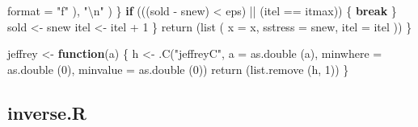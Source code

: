 \documentclass[
  12pt,
]{book}
\newenvironment{Shaded}{\begin{snugshade}}{\end{snugshade}}
\newcommand{\AttributeTok}[1]{\textcolor[rgb]{0.77,0.63,0.00}{#1}}
\newcommand{\ControlFlowTok}[1]{\textcolor[rgb]{0.13,0.29,0.53}{\textbf{#1}}}
\newcommand{\DecValTok}[1]{\textcolor[rgb]{0.00,0.00,0.81}{#1}}
\newcommand{\FunctionTok}[1]{\textcolor[rgb]{0.00,0.00,0.00}{#1}}
\newcommand{\NormalTok}[1]{#1}
\newcommand{\OtherTok}[1]{\textcolor[rgb]{0.56,0.35,0.01}{#1}}
\newcommand{\SpecialCharTok}[1]{\textcolor[rgb]{0.00,0.00,0.00}{#1}}
\newcommand{\StringTok}[1]{\textcolor[rgb]{0.31,0.60,0.02}{#1}}
\theoremstyle{definition}
\theoremstyle{definition}
\theoremstyle{definition}
\theoremstyle{definition}
\theoremstyle{remark}
\begin{document}
\begin{Shaded}
\begin{Highlighting}[]
            \AttributeTok{format =} \StringTok{"f"}
\NormalTok{          ),}
          \StringTok{"}\SpecialCharTok{\textbackslash{}n}\StringTok{"}
\NormalTok{        )}
\NormalTok{      \}}
      \ControlFlowTok{if}\NormalTok{ (((sold }\SpecialCharTok{{-}}\NormalTok{ snew) }\SpecialCharTok{\textless{}}\NormalTok{ eps) }\SpecialCharTok{||}\NormalTok{ (itel }\SpecialCharTok{==}\NormalTok{ itmax)) \{}
        \ControlFlowTok{break}
\NormalTok{      \}}
\NormalTok{      sold }\OtherTok{\textless{}{-}}\NormalTok{ snew}
\NormalTok{      itel }\OtherTok{\textless{}{-}}\NormalTok{ itel }\SpecialCharTok{+} \DecValTok{1}
\NormalTok{    \}}
    \FunctionTok{return}\NormalTok{ (}\FunctionTok{list}\NormalTok{ (}
      \AttributeTok{x =}\NormalTok{ x,}
      \AttributeTok{sstress =}\NormalTok{ snew,}
      \AttributeTok{itel =}\NormalTok{ itel}
\NormalTok{    ))}
\NormalTok{  \}}

\NormalTok{jeffrey }\OtherTok{\textless{}{-}} \ControlFlowTok{function}\NormalTok{(a) \{}
\NormalTok{  h }\OtherTok{\textless{}{-}}
    \FunctionTok{.C}\NormalTok{(}\StringTok{"jeffreyC"}\NormalTok{,}
       \AttributeTok{a =} \FunctionTok{as.double}\NormalTok{ (a),}
       \AttributeTok{minwhere =} \FunctionTok{as.double}\NormalTok{ (}\DecValTok{0}\NormalTok{),}
       \AttributeTok{minvalue =} \FunctionTok{as.double}\NormalTok{ (}\DecValTok{0}\NormalTok{))}
  \FunctionTok{return}\NormalTok{ (}\FunctionTok{list.remove}\NormalTok{ (h, }\DecValTok{1}\NormalTok{))}
\NormalTok{\}}
\end{Highlighting}
\end{Shaded}

\hypertarget{apcodeinverse}{%
\subsection{inverse.R}\label{apcodeinverse}}
\end{document}
